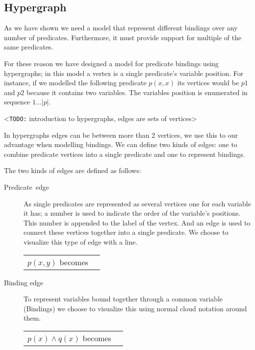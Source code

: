 \documentclass[../Master.tex]{subfiles}
\begin{document}
	\subsection*{Hypergraph}
	As we have shown we need a model that represent different bindings over any number of predicates.
	Furthermore, it must provide support for multiple of the same predicates.

	For these reason we have designed a model for predicate bindings using hypergraphs;
	in this	model a vertex is a single predicate's variable position.
	For instance, if we modelled the following predicate $p(x,x)$ its vertices would be $p1$ and $p2$ because it contains two variables.
	The variables position is enumerated in sequence $1\ldots |p|$.

	<\texttt{TODO:} introduction to hypergraphs, edges are sets of vertices>

	In hypergraphs edges can be between more than 2 vertices, we use this to our advantage when modelling bindings.
	We can define two kinds of edges: one to combine predicate vertices into a single predicate and one to represent bindings.

	The two kinds of edges are defined as follows:


	\begin{description}
		\item [{Predicate~edge}] As  single predicates are represented as several vertices one for each variable
		it has; a number is used to indicate the order of the variable's
		positions. This number is appended to the label of the vertex. And an edge is used to connect these vertices together into a single predicate.
		We choose to visualize this type of edge with a line.\\
		\begin{tabular}{c  c}

			$p(x, y)$ becomes &
            \raisebox{-.5\height}{\resizebox{0.16\linewidth}{!}{}}
		\end{tabular}
		\item[{Binding edge}] To represent variables bound together through a common variable (Bindings) we
		choose to visualize this using normal cloud notation around them.\\
		\begin{tabular}{c  c}

			$p(x) \land q(x)$ becomes &
            \raisebox{-.5\height}{\resizebox{0.2\linewidth}{!}{}}
		\end{tabular}
	\end{description}
\end{document}

